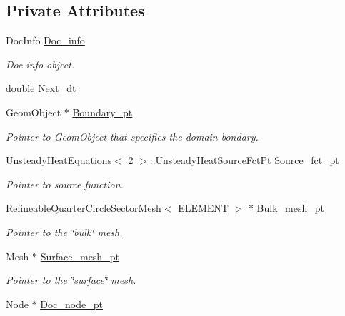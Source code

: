 \subsection*{Private Attributes}
\begin{DoxyCompactItemize}
\item 
Doc\+Info \hyperlink{classRefineableUnsteadyHeatProblem_a9ea9d79a57cb16a6292a637965767f7e}{Doc\+\_\+info}
\begin{DoxyCompactList}\small\item\em Doc info object. \end{DoxyCompactList}\item 
double \hyperlink{classRefineableUnsteadyHeatProblem_a2ffd16f7fe0fa56500f6dd730dc49bf3}{Next\+\_\+dt}
\item 
Geom\+Object $\ast$ \hyperlink{classRefineableUnsteadyHeatProblem_a368512778fbfd59e918104340466b1df}{Boundary\+\_\+pt}
\begin{DoxyCompactList}\small\item\em Pointer to Geom\+Object that specifies the domain bondary. \end{DoxyCompactList}\item 
Unsteady\+Heat\+Equations$<$ 2 $>$\+::Unsteady\+Heat\+Source\+Fct\+Pt \hyperlink{classRefineableUnsteadyHeatProblem_a99eb5a2cd4b680b4f83e739bd4e16639}{Source\+\_\+fct\+\_\+pt}
\begin{DoxyCompactList}\small\item\em Pointer to source function. \end{DoxyCompactList}\item 
Refineable\+Quarter\+Circle\+Sector\+Mesh$<$ E\+L\+E\+M\+E\+NT $>$ $\ast$ \hyperlink{classRefineableUnsteadyHeatProblem_afade341e03a4c97e62444c80adc9552f}{Bulk\+\_\+mesh\+\_\+pt}
\begin{DoxyCompactList}\small\item\em Pointer to the \char`\"{}bulk\char`\"{} mesh. \end{DoxyCompactList}\item 
Mesh $\ast$ \hyperlink{classRefineableUnsteadyHeatProblem_a2febbb317a74e427bf6304235d779fe6}{Surface\+\_\+mesh\+\_\+pt}
\begin{DoxyCompactList}\small\item\em Pointer to the \char`\"{}surface\char`\"{} mesh. \end{DoxyCompactList}\item 
Node $\ast$ \hyperlink{classRefineableUnsteadyHeatProblem_a7ff1982af5819bab492c693178be0c24}{Doc\+\_\+node\+\_\+pt}

\end{DoxyCompactItemize}

